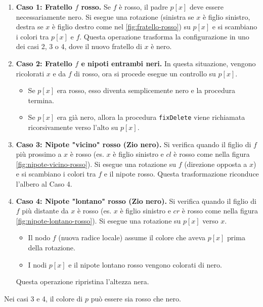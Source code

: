 \begin{enumerate}
    \item \textbf{Caso 1: Fratello $f$ rosso.}
    Se $f$ è rosso, il padre $p[x]$ deve essere necessariamente nero. Si esegue una rotazione (sinistra se $x$ è figlio sinistro, destra se $x$ è figlio destro come nel \ref{fig:fratello-rosso}) su $p[x]$ e si scambiano i colori tra $p[x]$ e $f$. Questa operazione trasforma la configurazione in uno dei casi 2, 3 o 4, dove il nuovo fratello di $x$ è nero.

    \item \textbf{Caso 2: Fratello $f$ e nipoti entrambi neri.}
    In questa situazione, vengono ricolorati $x$ e da $f$ di rosso, ora si procede esegue un controllo su $p[x]$.
    \begin{itemize}
        \item Se $p[x]$ era rosso, esso diventa semplicemente nero e la procedura termina.
        \item Se $p[x]$ era già nero, allora la procedura \texttt{fixDelete} viene richiamata ricorsivamente verso l'alto su $p[x]$.
    \end{itemize}

    \item \textbf{Caso 3: Nipote "vicino" rosso (Zio nero).}
    Si verifica quando il figlio di $f$ più prossimo a $x$ è rosso (es. $x$ è figlio sinistro e $cl$ è rosso come nella figura \ref{fig:nipote-vicino-rosso}). Si esegue una rotazione su $f$ (direzione opposta a $x$) e si scambiano i colori tra $f$ e il nipote rosso. Questa trasformazione riconduce l'albero al Caso 4.

    \item \textbf{Caso 4: Nipote "lontano" rosso (Zio nero).}
    Si verifica quando il figlio di $f$ più distante da $x$ è rosso (es. $x$ è figlio sinistro e $cr$ è rosso come nella figura \ref{fig:nipote-lontano-rosso}). Si esegue una rotazione su $p[x]$ verso $x$. 
    \begin{itemize}
        \item Il nodo $f$ (nuova radice locale) assume il colore che aveva $p[x]$ prima della rotazione.
        \item I nodi $p[x]$ e il nipote lontano rosso vengono colorati di nero.
    \end{itemize}
    Questa operazione ripristina l'altezza nera.
\end{enumerate}

\begin{kaobox}[frametitle=Note] 
Nei casi 3 e 4, il colore di $p$ può essere sia rosso che nero.
\end{kaobox}

